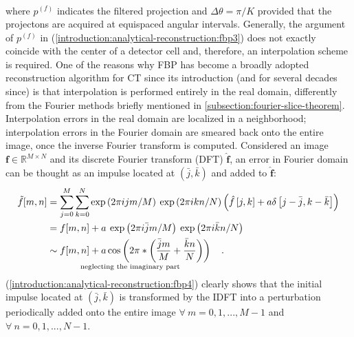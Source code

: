 {\begin{equation}
\begin{split}
\end{split}
\label{introduction:analytical-reconstruction:fbp3}
\end{equation}
where $p^{(f)}$ indicates the filtered projection and $\Delta\theta = \pi/K$ provided that the projectons are acquired at equispaced angular intervals.
Generally, the argument of $p^{(f)}$ in (\ref{introduction:analytical-reconstruction:fbp3}) does not exactly
coincide with the center of a detector cell and, therefore, an interpolation scheme is required.
\newline
One of the reasons why FBP has become a broadly adopted reconstruction algorithm for CT since its introduction 
(and for several decades since) is that interpolation is performed entirely in the real domain, differently from the Fourier
methods briefly mentioned in \ref{subsection:fourier-slice-theorem}. Interpolation errors in the real domain are localized
in a neighborhood; interpolation errors in the Fourier domain are smeared back onto the entire image, once the 
inverse Fourier transform is computed. Considered an image $\mathbf{f} \in \mathbb{R}^{M\times N}$ and
its discrete Fourier transform (DFT) $\mathbf{\hat{f}}$, an error in Fourier domain can be thought as an impulse 
located at $(\bar{j},\bar{k})$ and added to $\mathbf{\hat{f}}$:
\begin{align}
  \tilde{f}[m,n] &= \sum\limits_{j=0}^{M} \sum\limits_{k=0}^{N} \exp\left( 2\pi ijm/M \right) \: \exp\left( 2\pi ikn/N \right)					      
       \left( \hat{f}\left[j,k\right]
       + a\delta\left[ j - \bar{j} , k - \bar{k} \right] \right) \nonumber\\
       &= f[m,n] + a\:\exp\left( 2\pi i\bar{j}m/M \right)\:\exp\left( 2\pi i\bar{k}n/N \right)\nonumber\\
       &\underset{\text{neglecting the imaginary part}}{\sim f[m,n] + a\cos\left(2\pi * \left(\frac{\bar{j}m}{M} + \frac{\bar{k}n}{N} \right)\right)}\hspace{0.3cm}. 
\label{introduction:analytical-reconstruction:fbp4}
\end{align}
(\ref{introduction:analytical-reconstruction:fbp4}) clearly shows that the initial impulse located at $(\bar{j},\bar{k})$
is transformed by the IDFT into a perturbation periodically added onto the entire image $\forall\:m = 0,1,...,M-1$ and 
$\forall\:n = 0,1,...,N-1$.


}
